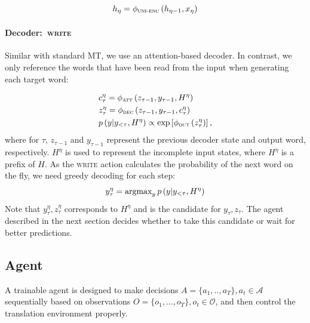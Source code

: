 \begin{equation}
\label{enc}
    h_{\eta} = \phi_{\textsc{uni-enc}}\left(h_{\eta-1}, x_{\eta}\right)
\end{equation}

\paragraph{Decoder:~\textsc{write}} Similar with standard MT, we use an attention-based decoder. In contrast, we only reference the words that have been read from the input when generating each target word:

\begin{equation}
\label{dec}
    \begin{split}
        &c_{\tau}^{\eta} = \phi_{\textsc{att}}\left(z_{\tau-1}, y_{\tau-1}, H^{\eta}\right) \\
        &z_{\tau}^{\eta} = \phi_{\textsc{dec}}\left(z_{\tau-1}, y_{\tau-1}, c_{\tau}^{\eta}\right)\\
        &p\left(y|y_{<\tau}, H^{\eta}\right) \propto \exp\left[\phi_{\textsc{out}}\left(z_{\tau}^{\eta}\right)\right],
    \end{split}
\end{equation}
where for $\tau$, $z_{\tau-1}$ and $y_{\tau-1}$ represent the previous decoder state and output word, respectively.
$H^{\eta}$ is used to represent the incomplete input states, where $H^{\eta}$ is a prefix of $H$.  %
As the \textsc{write} action calculates the probability of the next word on the fly, we need greedy decoding for each step:
\vspace{-5pt}
\begin{equation}
    y_{\tau}^{\eta} = \argmax\nolimits_{y}p\left(y|y_{<\tau}, H^{\eta}\right) 
\vspace{-2pt}
\end{equation}
Note that $y_{\tau}^{\eta}, z_{\tau}^{\eta}$ corresponds to $H^{\eta}$ and is the candidate for $y_{\tau}, z_{\tau}$.
The agent described in the next section decides whether to take this candidate or wait for better predictions.

\subsection{Agent}
\label{sec:agent}
A trainable agent is designed to make decisions $A=\{a_1, .., a_T\}, a_t \in \mathcal{A}$ sequentially based on observations $O=\{o_1, ..., o_T\}, o_t \in \mathcal{O}$, and then control the translation environment properly. %

